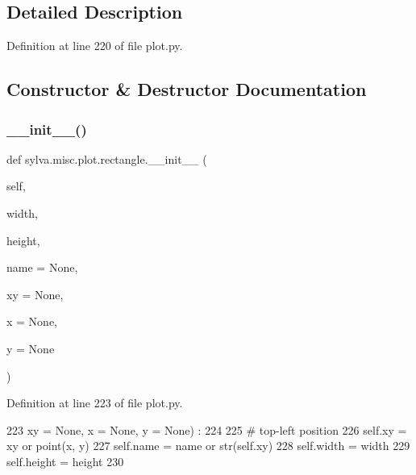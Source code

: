 \subsection{Detailed Description}


Definition at line 220 of file plot.\+py.



\subsection{Constructor \& Destructor Documentation}
\mbox{\label{classsylva_1_1misc_1_1plot_1_1rectangle_aa01b01f82b1ab5f4e7fb2bba478a13e6}} 
\subsubsection{\texorpdfstring{\+\_\+\+\_\+init\+\_\+\+\_\+()}{\_\_init\_\_()}}
{\footnotesize\ttfamily def sylva.\+misc.\+plot.\+rectangle.\+\_\+\+\_\+init\+\_\+\+\_\+ (\begin{DoxyParamCaption}\item[{}]{self,  }\item[{}]{width,  }\item[{}]{height,  }\item[{}]{name = {\ttfamily None},  }\item[{}]{xy = {\ttfamily None},  }\item[{}]{x = {\ttfamily None},  }\item[{}]{y = {\ttfamily None} }\end{DoxyParamCaption})}



Definition at line 223 of file plot.\+py.


\begin{DoxyCode}
223       xy = \textcolor{keywordtype}{None}, x = \textcolor{keywordtype}{None}, y = \textcolor{keywordtype}{None}) :
224 
225       \textcolor{comment}{# top-left position}
226       self.xy = xy \textcolor{keywordflow}{or} point(x, y)
227       self.name = name \textcolor{keywordflow}{or} str(self.xy)
228       self.width = width
229       self.height = height
230 
\end{DoxyCode}


